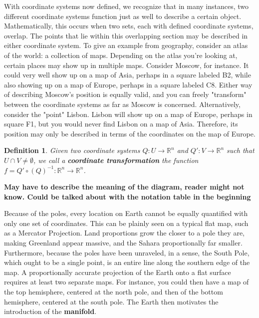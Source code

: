\documentclass{book}
\newtheorem{defn}[equation]{Definition}
\begin{document}
With coordinate systems now defined, we recognize that in many instances, two different coordinate systems function just as well to describe a certain object. Mathematically, this occurs when two sets, each with defined coordinate systems, overlap. The points that lie within this overlapping section may be described in either coordinate system. To give an example from geography, consider an atlas of the world: a collection of maps. Depending on the atlas you're looking at, certain places may show up in multiple maps. Consider Moscow, for instance. It could very well show up on a map of Asia, perhaps in a square labeled B2, while also showing up on a map of Europe, perhaps in a square labeled C8. Either way of describing Moscow's position is equally valid, and you can freely "transform" between the coordinate systems as far as Moscow is concerned. Alternatively, consider the "point" Lisbon. Lisbon will show up on a map of Europe, perhaps in square F1, but you would never find Lisbon on a map of Asia. Therefore, its position may only be described in terms of the coordinates on the map of Europe.


\begin{defn}
	Given two coordinate systems  $Q : U \to \mathbb{R}^n$ and $Q' : V \to \mathbb{R}^n$ such that $U \cap V \neq \emptyset$, we call a \textbf{coordinate transformation} the function $f = Q' \circ (Q)^{-1} : \mathbb{R}^n \to \mathbb{R}^n$.
\end{defn}



\textbf{May have to describe the meaning of the diagram, reader might not know. Could be talked about with the notation table in the beginning}



Because of the poles, every location on Earth cannot be equally quantified with only one set of coordinates. This can be plainly seen on a typical flat map, such as a Mercator Projection. Land proportions grow the closer to a pole they are, making Greenland appear massive, and the Sahara proportionally far smaller. Furthermore, because the poles have been unraveled, in a sense, the South Pole, which ought to be a single point, is an entire line along the southern edge of the map. A proportionally accurate projection of the Earth onto a flat surface requires at least two separate maps. For instance, you could then have a map of the top hemisphere, centered at the north pole, and then of the bottom hemisphere, centered at the south pole. The Earth then motivates the introduction of the \textbf{manifold}. 
\end{document}
